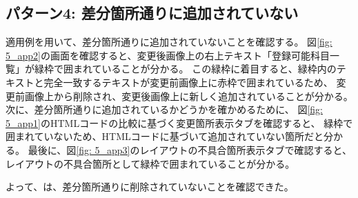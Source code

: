 \subsection{パターン4: 差分箇所通りに追加されていない}\label{sec:result_area4}
適用例を用いて、差分箇所通りに追加されていないことを確認する。
図\ref{fig: 5_app2}の画面を確認すると、変更後画像上の右上テキスト「登録可能科目一覧」が緑枠で囲まれていることが分かる。
この緑枠に着目すると、緑枠内のテキストと完全一致するテキストが変更前画像上に赤枠で囲まれているため、
変更前画像上から削除され、変更後画像上に新しく追加されていることが分かる。
次に、差分箇所通りに追加されているかどうかを確かめるために、
図\ref{fig: 5_app1}のHTMLコードの比較に基づく変更箇所表示タブを確認すると、
緑枠で囲まれていないため、HTMLコードに基づいて追加されていない箇所だと分かる。
最後に、図\ref{fig: 5_app3}のレイアウトの不具合箇所表示タブで確認すると、
レイアウトの不具合箇所として緑枠で囲まれていることが分かる。
\par
よって、\toolName は、差分箇所通りに削除されていないことを確認できた。





